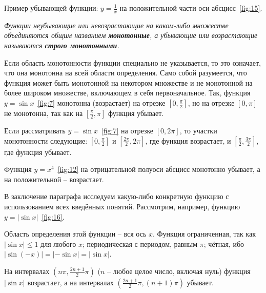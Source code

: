 Пример убывающей функции: $y = \frac{1}{x}$ на положительной части оси
абсцисс~\ref{fig:15}.

\textit{Функции неубывающие или невозрастающие на каком-либо множестве
объединяются общим названием \textbf{монотонные}, а убывающие или возрастающие
называются \textbf{строго монотонными}.}


Если область монотонности функции специально не указывается, то это означает,
что она монотонна на всей области определения. Само собой разумеется, что
функция может быть монотонной на некотором множестве и не монотонной на более
широком множестве, включающем в себя первоначальное. Так, функция $y =
\sin{x}$~\ref{fig:7} монотонна (возрастает) на отрезке $[0, \frac{\pi}{2}]$, но
на отрезке $[0,\pi]$ не монотонна, так как на $[\frac{\pi}{2}, \pi]$ функция
убывает.

Если рассматривать $y = \sin{x}$~\ref{fig:7} на отрезке $[0,2\pi]$, то участки
монотонности следующие: $[0, \frac{\pi}{2}]$ и $[\frac{2\pi}{2}, 2\pi]$, где
функция возрастает, и $[\frac{\pi}{2}, \frac{3\pi}{2}]$, где функция убывает.

Функция $y = x^4$~\ref{fig:12} на отрицательной полуоси абсцисс монотонно
убывает, а на положительной -- возрастает.

В заключение параграфа исследуем какую-либо конкретную функцию с использованием
всех введённых понятий. Рассмотрим, например, функцию $y =
|\sin{x}|$~\ref{fig:16}.


Область определения этой функции -- вся ось $x$. Функция ограниченная, так как
$|\sin{x}| \leq 1$ для любого $x$; периодическая с периодом, равным $\pi$;
чётная, ибо $|\sin{(-x)}| = |-\sin{x}| = |\sin{x}|$.

На интервалах $(n\pi, \frac{2n + 1}{2}\pi)$ ($n$ -- любое целое число, включая
нуль) функция $|\sin{x}|$ возрастает, а на интервалах $(\frac{2n + 1}{2}\pi,
(n + 1)\pi)$ убывает.

